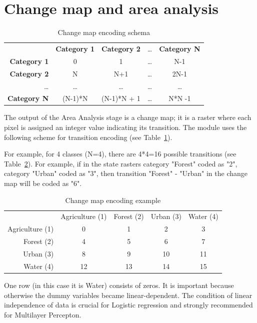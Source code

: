 \documentclass{report}
\begin{document}
\section{Change map and area analysis}\label{sec:changemap_encoding}

\begin{table}[]
\centering
\caption{Change map encoding schema}
\begin{tabular}{rcccc}
           & \bf{Category 1} & \bf{Category 2} & \dots & \bf{Category N} \\
\bf{Category 1} & 0          & 1          & \dots  & N-1          \\
\bf{Category 2} &  N         & N+1        & \dots  & 2N-1       \\
 \dots     &  \dots     &   \dots    & \dots  &   \dots  \\
\bf{Category N} &  (N-1)*N   & (N-1)*N + 1 & \dots  &  N*N -1          
\end{tabular}
\label{tab:changemap_encoding}
\end{table}

The output of the Area Analysis stage is a change map; it is a raster where each pixel is assigned an integer value indicating its transition.
The module uses the following scheme for transition encoding (see Table~\ref{tab:changemap_encoding}).

For example, for 4 classes (N=4), there are 4*4=16 possible transitions (see Table~\ref{tab:changemap_encoding_example}).  
For example, if in the state rasters category "Forest" coded as "2", category "Urban" coded as "3", then transition "Forest" - "Urban" in the change map will be coded as "6". 

\begin{table}[]
\centering
\caption{Change map encoding example}
\begin{tabular}{rcccc}
           & Agriculture (1) & Forest (2) & Urban (3) & Water (4) \\
Agriculture (1) & 0          & 1          & 2  & 3          \\
Forest (2) &  4         & 5        & 6  & 7       \\
Urban (3) &  8     &   9    & 10  &   11  \\
Water (4) &  12   & 13 & 14  &  15          
\end{tabular}
\label{tab:changemap_encoding_example}
\end{table}
One row (in this case it is Water) consists of zeros.
It is important because otherwise the dummy variables became linear-dependent.
The condition of linear independence of data is crucial for Logistic regression and strongly recommended for Multilayer Percepton. 
\end{document}
